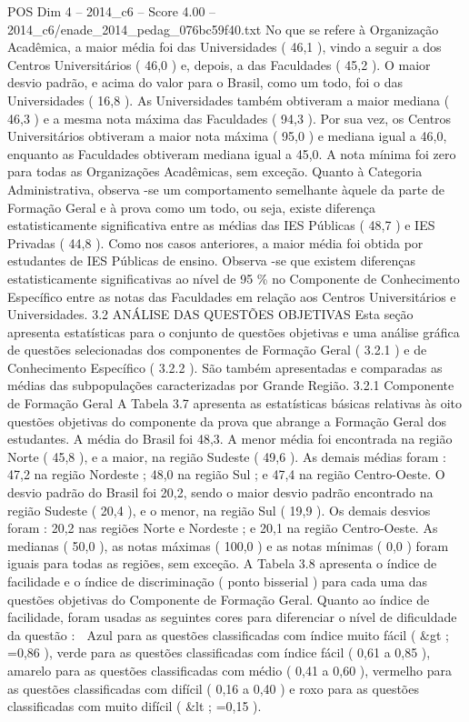 \begin{textsample}{POS Dim 4 – 2014\_c6 – Score 4.00 – 2014\_c6/enade\_2014\_pedag\_076bc59f40.txt}
No que se refere à Organização Acadêmica, a maior média foi das Universidades ( 46,1 ), vindo a seguir a dos Centros Universitários ( 46,0 ) e, depois, a das Faculdades ( 45,2 ).
O maior desvio padrão, e acima do valor para o Brasil, como um todo, foi o das Universidades ( 16,8 ).
As Universidades também obtiveram a maior mediana ( 46,3 ) e a mesma nota máxima das Faculdades ( 94,3 ).
Por sua vez, os Centros Universitários obtiveram a maior nota máxima ( 95,0 ) e mediana igual a 46,0, enquanto as Faculdades obtiveram mediana igual a 45,0.
A nota mínima foi zero para todas as Organizações Acadêmicas, sem exceção.
Quanto à Categoria Administrativa, observa -se um comportamento semelhante àquele da parte de Formação Geral e à prova como um todo, ou seja, existe diferença estatisticamente significativa entre as médias das IES Públicas ( 48,7 ) e IES Privadas ( 44,8 ).
Como nos casos anteriores, a maior média foi obtida por estudantes de IES Públicas de ensino.
Observa -se que existem diferenças estatisticamente significativas ao nível de 95 \% no Componente de Conhecimento Específico entre as notas das Faculdades em relação aos Centros Universitários e Universidades. 3.2 ANÁLISE DAS QUESTÕES OBJETIVAS Esta seção apresenta estatísticas para o conjunto de questões objetivas e uma análise gráfica de questões selecionadas dos componentes de Formação Geral ( 3.2.1 ) e de Conhecimento Específico ( 3.2.2 ).
São também apresentadas e comparadas as médias das subpopulações caracterizadas por Grande Região. 3.2.1 Componente de Formação Geral A Tabela 3.7 apresenta as estatísticas básicas relativas às oito questões objetivas do componente da prova que abrange a Formação Geral dos estudantes.
A média do Brasil foi 48,3.
A menor média foi encontrada na região Norte ( 45,8 ), e a maior, na região Sudeste ( 49,6 ).
As demais médias foram : 47,2 na região Nordeste ; 48,0 na região Sul ; e 47,4 na região Centro-Oeste.
O desvio padrão do Brasil foi 20,2, sendo o maior desvio padrão encontrado na região Sudeste ( 20,4 ), e o menor, na região Sul ( 19,9 ).
Os demais desvios foram : 20,2 nas regiões Norte e Nordeste ; e 20,1 na região Centro-Oeste.
As medianas ( 50,0 ), as notas máximas ( 100,0 ) e as notas mínimas ( 0,0 ) foram iguais para todas as regiões, sem exceção.
A Tabela 3.8 apresenta o índice de facilidade e o índice de discriminação ( ponto bisserial ) para cada uma das questões objetivas do Componente de Formação Geral.
Quanto ao índice de facilidade, foram usadas as seguintes cores para diferenciar o nível de dificuldade da questão :  Azul para as questões classificadas com índice muito fácil ( \&gt ; =0,86 ), verde para as questões classificadas com índice fácil ( 0,61 a 0,85 ), amarelo para as questões classificadas com médio ( 0,41 a 0,60 ), vermelho para as questões classificadas com difícil ( 0,16 a 0,40 ) e roxo para as questões classificadas com muito difícil ( \&lt ; =0,15 ).

\end{textsample}
